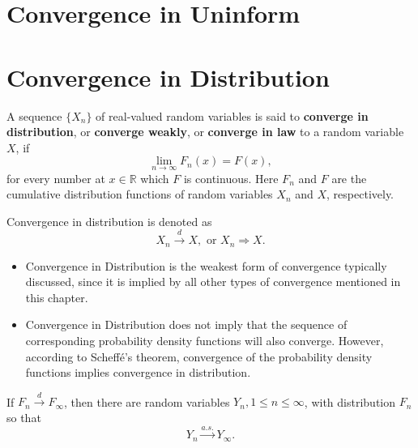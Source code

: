 \section{Convergence in Uninform}

\begin{definition}

\end{definition}

\section{Convergence in Distribution}

\begin{definition} \label{def:convergence-in-distribution}
    A sequence $\{X_n\}$ of real-valued random variables is said to \textbf{converge in distribution}, or \textbf{converge weakly}, or \textbf{converge in law} to a random variable $X$, if
    \begin{equation}
        \lim_{n\to\infty}F_n(x)=F(x),
    \end{equation}
    for every number at $x\in\mathbb{R}$ which $F$ is continuous. Here $F_n$ and $F$ are the cumulative distribution functions of random variables $X_n$ and $X$, respectively.

    Convergence in distribution is denoted as
    \begin{equation}
        X_n \stackrel{d}{\rightarrow} X, \text{ or } X_n \Rightarrow X.
    \end{equation}
\end{definition}

\begin{note}
    \begin{itemize}
        \item Convergence in Distribution is the weakest form of convergence typically discussed, since it is implied by all other types of convergence mentioned in this chapter.
        \item Convergence in Distribution does not imply that the sequence of corresponding probability density functions will also converge. However, according to Scheff\'e's theorem, convergence of the probability density functions implies convergence in distribution.
    \end{itemize}
\end{note}

\begin{lemma} \label{lem:distribution-to-probability}
    If $F_n\stackrel{d}{\rightarrow}F_\infty$, then there are random variables $Y_n,1\leq n\leq \infty$, with distribution $F_n$ so that
    \begin{equation}
        Y_n\stackrel{a.s.}{\rightarrow}Y_\infty.
    \end{equation}
\end{lemma}

